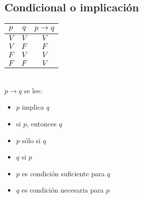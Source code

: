 \subsection{Condicional o implicaci\'on}
  \begin{tabular}{ccc}
    $p$  & $q$ & $p \rightarrow q$ \\ \hline
    $V$ & $V$ & $V$ \\
    $V$ & $F$ &$F$ \\
    $F$ & $V$ & $V$ \\
    $F$ & $F$ & $V$\\
  \end{tabular} \\
$p \rightarrow q$ se lee:
  \begin{itemize}
   \item $p$ implica $q$
    \item si $p$, entonces $q$
     \item $p$ s\'olo si $q$
      \item $q$ si $p$
      \item $p$ es condici\'on suficiente para $q$
      \item $q$ es condici\'on necesaria para $p$
  \end{itemize}

